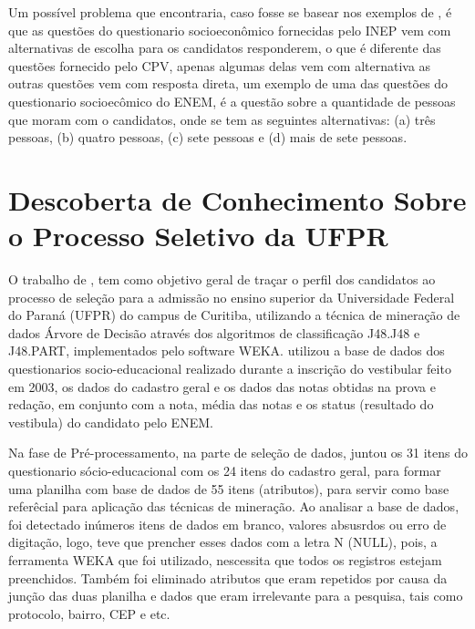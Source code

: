 \par
Um possível problema que encontraria, caso fosse se basear nos exemplos de , é que as questões do questionario socioeconômico fornecidas pelo INEP vem com alternativas de escolha para os candidatos responderem, o que é diferente das questões fornecido pelo CPV, apenas algumas delas vem com alternativa as outras questões vem com resposta direta, um exemplo de uma das questões do questionario socioecômico do ENEM, é a questão sobre a quantidade de pessoas que moram com o candidatos, onde se tem as seguintes alternativas: (a) três pessoas, (b) quatro pessoas, (c) sete pessoas e (d) mais de sete pessoas.

\section{Descoberta de Conhecimento Sobre o Processo Seletivo da UFPR}

\par
O trabalho de , tem como objetivo geral de traçar o perfil dos candidatos ao processo de seleção para a admissão no ensino superior da Universidade Federal do Paraná (UFPR) do campus de Curitiba, utilizando a técnica de mineração de dados Árvore de Decisão através dos algoritmos de classificação J48.J48 e J48.PART, implementados pelo software WEKA.  utilizou a base de dados dos questionarios socio-educacional realizado durante a inscrição do vestibular feito em 2003, os dados do cadastro geral e os dados das notas obtidas na prova e redação, em conjunto com a nota, média das notas e os status (resultado do vestibula) do candidato pelo ENEM. 

\par
Na fase de Pré-processamento, na parte de seleção de dados,  juntou os 31 itens do questionario sócio-educacional com os 24 itens do cadastro geral, para formar uma planilha com base de dados de 55 itens (atributos), para servir como base referêcial para aplicação das técnicas de mineração. Ao analisar a base de dados, foi detectado inúmeros itens de dados em branco, valores absusrdos ou erro de digitação, logo,  teve que prencher esses dados com a letra N (NULL), pois, a ferramenta WEKA que foi utilizado, nescessita que todos os registros estejam preenchidos. Também foi eliminado atributos que eram repetidos por causa da junção das duas planilha e dados que eram irrelevante para a pesquisa, tais como protocolo, bairro, CEP e etc.

